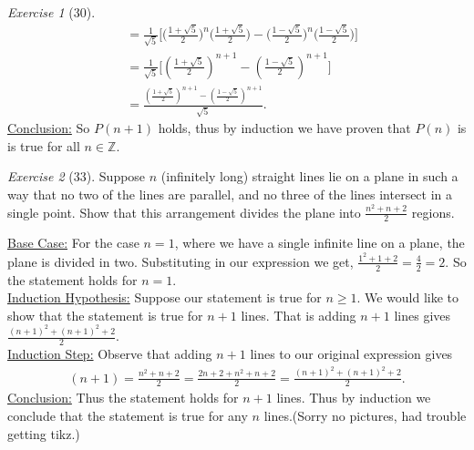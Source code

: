 \documentclass[12pt]{amsart}
\makeatletter
\theoremstyle{remark}
\newtheorem*{exercise}{Exercise}%
\def\ZZ{\ensuremath{\mathbb Z}}
\renewenvironment{proof}[1][\proofname]{\par\doublespacing
  \pushQED{\qed}%
  \normalfont \topsep6\p@\@plus6\p@\relax
  \list{}{%
    \settowidth{\leftmargin}{\itshape\proofname:\hskip\labelsep}%
    \setlength{\labelwidth}{0pt}%
    \setlength{\itemindent}{-\leftmargin}%
  }%
  \item[\hskip\labelsep\itshape#1\@addpunct{:}]\ignorespaces
}{%
  \popQED\endlist\@endpefalse
  \singlespacing
}
\theoremstyle{mycomment}
\makeatother
\begin{document}
\begin{exercise}[30]
\begin{proof}
\begin{align*}
        &= \frac{1}{\sqrt{5}} \biggl[ \biggl(\frac{1+\sqrt{5}}{2}\biggr)^n \biggl(\frac{1+\sqrt{5}}{2}\biggr)  - \biggl(\frac{1-\sqrt{5}}{2}\biggr)^n   \biggl(\frac{1-\sqrt{5}}{2}\biggr)\biggr] \\
        &= \frac{1}{\sqrt{5}}\biggl[\left(\frac{1+\sqrt{5}}{2}\right)^{n+1}-\left(\frac{1-\sqrt{5}}{2}\right)^{n+1}\biggr] \\
        &=  \frac{\left(\frac{1+\sqrt{5}}{2}\right)^{n+1}-\left(\frac{1-\sqrt{5}}{2}\right)^{n+1}}{\sqrt{5}}.
\end{align*}
\underline{Conclusion:} So $P(n+1)$ holds, thus by induction we have proven that $P(n)$ is is true for all $n \in \ZZ$.
\end{proof}
\end{exercise}

\begin{exercise}[33] Suppose $n$ (infinitely long) straight lines lie on a plane in such a way that no two of the lines are parallel, and no three of the lines intersect in a single point. Show that this arrangement divides the plane into $\frac{n^{2}+n+2}{2}$ regions.
\begin{proof}
  \underline{Base Case:} For the case $n = 1$, where we have a single infinite line on a plane, the plane is divided in two. Substituting in our expression we get,  $\frac{1^{2}+1+2}{2} = \frac{4}{2} = 2$.  So the statement holds for $n = 1$. \\
  \underline{Induction Hypothesis:} Suppose our statement is true for $n \geq 1$. We would like to show that the statement is true for $n+1$ lines. That is adding $n+1$ lines gives $\frac{(n+1)^2 + (n+1)^2 + 2}{2}$. \\
  \underline{Induction Step:} Observe that adding $n+1$ lines to our original expression gives
  \begin{align*}
    (n+1) = \frac{n^{2}+n+2}{2} = \frac{2n + 2 + n^2 + n + 2}{2} = \frac{(n+1)^2 + (n+1)^2 + 2}{2}.
  \end{align*}
  \underline{Conclusion:} Thus the statement holds for $n+1$ lines. Thus by induction we conclude that the statement is true for any $n$ lines.(Sorry no pictures, had trouble getting tikz.)
\end{proof}
\end{exercise}
\end{document}
